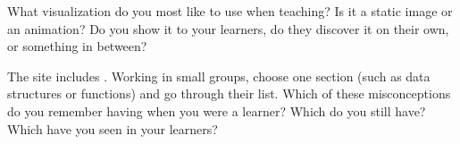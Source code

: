 What visualization do you most like to use when teaching? Is it a static
image or an animation? Do you show it to your learners, do they discover
it on their own, or something in between?


The  site
includes . Working in small groups, choose one
section (such as data structures or functions) and go through their
list. Which of these misconceptions do you remember having when you
were a learner? Which do you still have? Which have you seen in your
learners?
